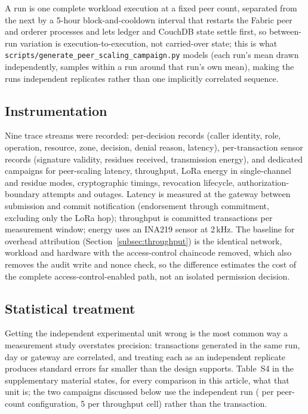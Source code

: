 \documentclass[a4paper,fleqn]{cas-sc}
\begin{document}
A run is one complete workload execution at a fixed peer count, separated
from the next by a 5-hour block-and-cooldown interval that restarts the
Fabric peer and orderer processes and lets ledger and CouchDB state
settle first, so between-run variation is execution-to-execution, not
carried-over state; this is what
\texttt{scripts/generate\_peer\_scaling\_campaign.py} models (each run's
mean drawn independently, samples within a run around that run's own
mean), making the runs independent replicates rather than one implicitly
correlated sequence.

\subsection{Instrumentation}
\label{subsec:instrumentation}

Nine trace streams were recorded: per-decision records (caller identity,
role, operation, resource, zone, decision, denial reason, latency),
per-transaction sensor records (signature validity, residues received,
transmission energy), and dedicated campaigns for peer-scaling latency,
throughput, LoRa energy in single-channel and residue modes,
cryptographic timings, revocation lifecycle, authorization-boundary
attempts and outages. Latency is measured at the gateway between
submission and commit notification (endorsement through commitment,
excluding only the LoRa hop); throughput is committed transactions per
measurement window; energy uses an INA219 sensor at 2\,kHz. The baseline
for overhead attribution (Section~\ref{subsec:throughput}) is the
identical network, workload and hardware with the access-control
chaincode removed, which also removes the audit write and nonce check, so
the difference estimates the cost of the complete access-control-enabled
path, not an isolated permission decision.

\subsection{Statistical treatment}
\label{subsec:stats}

Getting the independent experimental unit wrong is the most common way a
measurement study overstates precision: transactions generated in the same
run, day or gateway are correlated, and treating each as an independent
replicate produces standard errors far smaller than the design supports.
Table~S4 in the supplementary material states, for every comparison in
this article, what that unit is; the two campaigns discussed below use the
independent run (\PartRunsPerConfig{} per peer-count configuration, 5 per
throughput cell) rather than the transaction.
\end{document}
